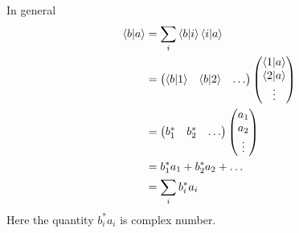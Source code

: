 In general
\begin{align}\label{eqn3.57-3.62}
	\braket{b}{a} &= \sum_{i} \braket{b}{i}\braket{i}{a}			\\
	&= \left(
	\begin{matrix}
		\braket{b}{1} & \braket{b}{2} & \ldots
	\end{matrix}
	\right) \left(
	\begin{matrix}
		\braket{1}{a} \\ \braket{2}{a} \\ \vdots
	\end{matrix}
	\right)\\
	&= \left(
	\begin{matrix}
		b_1^* & b_2^* & \ldots
	\end{matrix}
	\right) \left(
	\begin{matrix}
		a_1 \\ a_2 \\ \vdots
	\end{matrix}
	\right)\\
	&= b_1^* a_1 + b_2^* a_2 + \ldots \\
	&= \sum_{i} b_i^* a_i
\end{align}
Here the quantity $b_i^* a_i$ is complex number.



